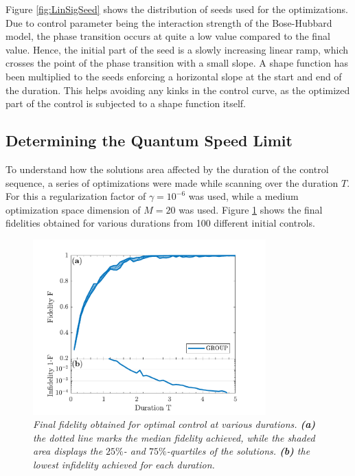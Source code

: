 Figure \ref{fig:LinSigSeed} shows the distribution of seeds used for the optimizations. Due to control parameter being the interaction strength of the Bose-Hubbard model, the phase transition occurs at quite a low value compared to the final value. Hence, the initial part of the seed is a slowly increasing linear ramp, which crosses the point of the phase transition with a small slope. A shape function has been multiplied to the seeds enforcing a horizontal slope at the start and end of the duration. This helps avoiding any kinks in the control curve, as the optimized part of the control is subjected to a shape function itself.


\subsection{Determining the Quantum Speed Limit}
To understand how the solutions area affected by the duration of the control sequence, a series of optimizations were made while scanning over the duration $T$. For this a regularization factor of $\gamma = 10^{-6}$ was used, while a medium optimization space dimension of $M = 20$ was used. Figure \ref{fig:FidelityDuration5} shows the final fidelities obtained for various durations from 100 different initial controls.
\begin{figure}[h!]
    \centering
    \includegraphics[width=0.8\textwidth]{Figures/5part/FidelityDuration.pdf}
    \caption{\textit{Final fidelity obtained for optimal control at various durations. \textbf{(a)} the dotted line marks the median fidelity achieved, while the shaded area displays the $25\%$- and $75\%$-quartiles of the solutions. \textbf{(b)} the lowest infidelity achieved for each duration. }}
    \label{fig:FidelityDuration5}
\end{figure}
